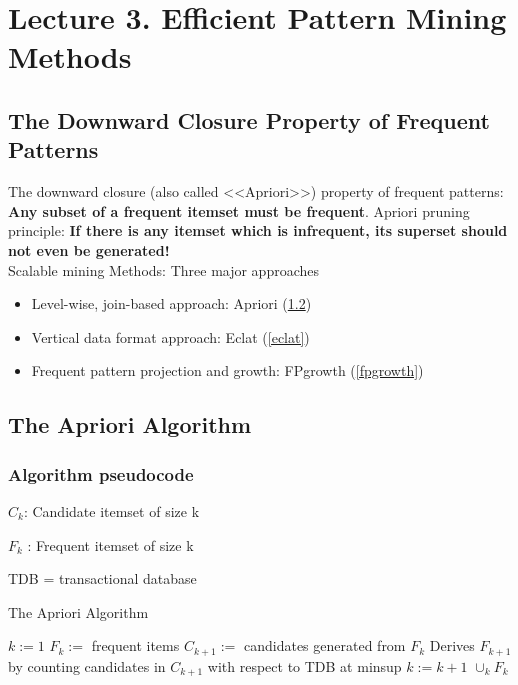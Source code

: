 \section{Lecture 3. Efficient Pattern Mining Methods}
\subsection{The Downward Closure Property of Frequent Patterns}
The downward closure (also called <<Apriori>>) property of frequent patterns: \textbf{Any subset of a frequent itemset must be frequent}. Apriori pruning principle: \textbf{If there is any itemset which is infrequent, its superset should not even be generated!}\\

Scalable mining Methods: Three major approaches
\begin{itemize}
\item Level-wise, join-based approach: Apriori (\ref{apriori})
\item Vertical data format approach: Eclat (\ref{eclat})
\item Frequent pattern projection and growth: FPgrowth (\ref{fpgrowth})
\end{itemize}

\subsection{The Apriori Algorithm}\label{apriori}
\subsubsection{Algorithm pseudocode}
$C_k$: Candidate itemset of size k

$F_k$ : Frequent itemset of size k

TDB = transactional database\\

\begin{algorithm}
\caption{The Apriori Algorithm}
\begin{algorithmic}
\State $k := 1$
\State $F_k :=$ frequent items 
    \State $C_{k+1} :=$ candidates generated from $F_k$ 
    \State Derives $F_{k+1}$ by counting candidates in $C_{k+1}$ with respect to TDB at minsup
    \State $k := k + 1$
\EndWhile
\State \Return $\cup_k F_k$  
\end{algorithmic}
\end{algorithm}

